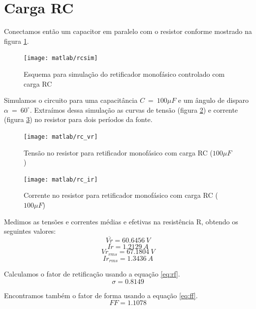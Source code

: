 \documentclass{article}
\begin{document}
\section{Carga RC}
Conectamos então um capacitor em paralelo com o resistor conforme mostrado na figura \ref{fig:rcsim}.
\begin{figure}[H]
	\centering
	\texttt{[image: matlab/rcsim]}
	\caption{Esquema para simulação do retificador monofásico controlado com carga RC}
	\label{fig:rcsim}
\end{figure}

Simulamos o circuito para uma capacitância $C\ =\ 100\mu F$ e um ângulo de disparo $\alpha\ =\ 60^\circ$. Extraímos dessa simulação as curvas de tensão (figura \ref{fig:rcvr}) e corrente (figura \ref{fig:rcir}) no resistor para dois períodos da fonte.
\begin{figure}[H]
	\centering
	\texttt{[image: matlab/rc\_vr]}
	\caption{Tensão no resistor para retificador monofásico com carga RC ($100\mu F$)}
	\label{fig:rcvr}
\end{figure}
\begin{figure}[H]
	\centering
	\texttt{[image: matlab/rc\_ir]}
	\caption{Corrente no resistor para retificador monofásico com carga RC ($100\mu F$)}
	\label{fig:rcir}
\end{figure}

Medimos as tensões e correntes médias e efetivas na resistência R, obtendo os seguintes valores:
\begin{equation}
\overline{Vr} = 60.6456\ V
\end{equation}
\begin{equation}
\overline{Ir} = 1.2129\ A
\end{equation}
\begin{equation}
Vr_{rms} = 67.1804\ V
\end{equation}
\begin{equation}
Ir_{rms} = 1.3436\ A
\end{equation}

Calculamos o fator de retificação usando a equação \ref{eq:rf}.
\begin{equation}
\sigma = 0.8149
\end{equation}

Encontramos também o fator de forma usando a equação \ref{eq:ff}.
\begin{equation}
FF = 1.1078
\end{equation}
\end{document}

